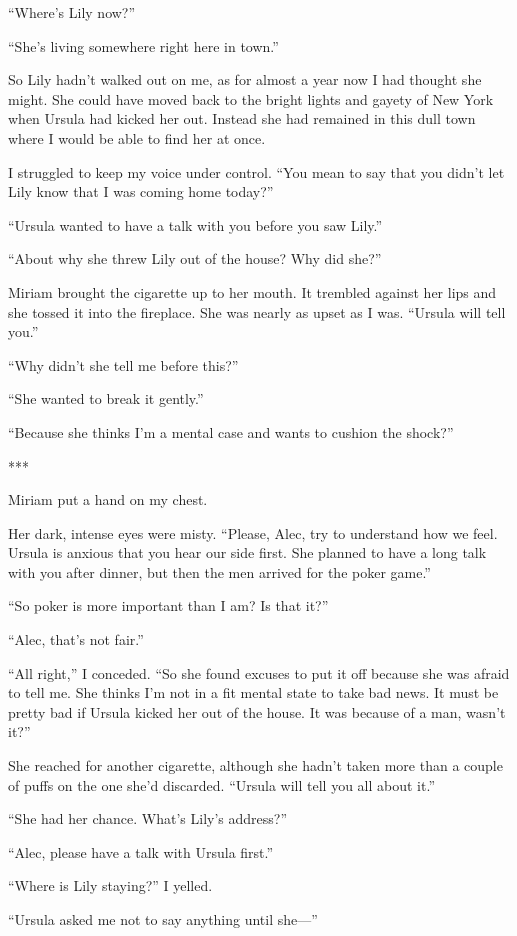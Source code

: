 {“Where’s Lily now?”

“She’s living somewhere right here in town.”

So Lily hadn’t walked out on me, as for almost a year now I had thought she might. She could have moved back to the bright lights and gayety of New York when Ursula had kicked her out. Instead she had remained in this dull town where I would be able to find her at once.

I struggled to keep my voice under control. “You mean to say that you didn’t let Lily know that I was coming home today?”

“Ursula wanted to have a talk with you before you saw Lily.”

“About why she threw Lily out of the house? Why did she?”

Miriam brought the cigarette up to her mouth. It trembled against her lips and she tossed it into the fireplace. She was nearly as upset as I was. “Ursula will tell you.”

“Why didn’t she tell me before this?”

“She wanted to break it gently.”

“Because she thinks I’m a mental case and wants to cushion the shock?”

***

Miriam put a hand on my chest.

Her dark, intense eyes were misty. “Please, Alec, try to understand how we feel. Ursula is anxious that you hear our side first. She planned to have a long talk with you after dinner, but then the men arrived for the poker game.”

“So poker is more important than I am? Is that it?”

“Alec, that’s not fair.”

“All right,” I conceded. “So she found excuses to put it off because she was afraid to tell me. She thinks I’m not in a fit mental state to take bad news. It must be pretty bad if Ursula kicked her out of the house. It was because of a man, wasn’t it?”

She reached for another cigarette, although she hadn’t taken more than a couple of puffs on the one she’d discarded. “Ursula will tell you all about it.”

“She had her chance. What’s Lily’s address?”

“Alec, please have a talk with Ursula first.”

“Where is Lily staying?” I yelled.

“Ursula asked me not to say anything until she—”

}
